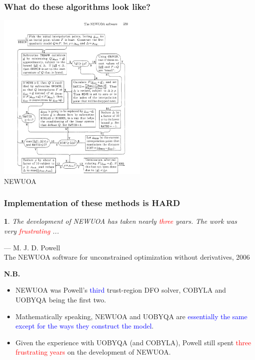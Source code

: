 \documentclass[slidestop,mathserif,xcolor=dvipsnames]{beamer}
\newcommand{\blue}[1]{\textcolor{blue}{#1}}
\newcommand{\red}[1]{\textcolor{red}{#1}}
\newtheorem*{mybox}{}
\newcommand{\nb}{\textbf{N.B.}}
\begin{document}
\begin{frame}
    \frametitle{What do these algorithms look like?}
    \vspace{-2ex}
\begin{center}
    \includegraphics[width = 0.55\textwidth]{newuoa_alg.png}
    \\[1ex]NEWUOA
\end{center}
\end{frame}


\begin{frame}
    \frametitle{Implementation of these methods is HARD}
    \vspace{3ex}
    \begin{mybox}
    \textnormal{The development of NEWUOA has taken nearly \red{three} years. The work
    was very \red{frustrating} ...
}
\end{mybox}
    \begin{flushright}
        --- {M. J. D. Powell}
    \vspace{0.3ex}
    \\\small{The NEWUOA software for unconstrained optimization without derivatives, 2006}
    \end{flushright}

    \nb
    \begin{itemize}
        \item NEWUOA was Powell's \blue{third} trust-region DFO solver, COBYLA and UOBYQA being the first two.
    \vspace{0.3ex}
\item Mathematically speaking, NEWUOA and UOBYQA are \blue{essentially the same except for the
    ways they construct the model}.
    \vspace{0.3ex}
\item Given the experience with UOBYQA (and COBYLA), Powell still spent \red{three frustrating
        years} on the development of NEWUOA.
    \end{itemize}
\end{frame}
\end{document}
